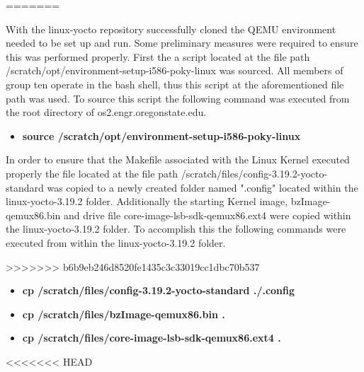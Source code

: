\documentclass[10pt,onecolumn,draftclsnofoot]{IEEEtran} %
\begin{document}
\begin{singlespace}
=======
\hfill\break

  \normalfont \indent With the linux-yocto repository successfully cloned the QEMU environment needed to be set up and run. Some preliminary measures were required to ensure this was performed properly. First the a script located at the file path /scratch/opt/environment-setup-i586-poky-linux was sourced. All members of group ten operate in the bash shell, thus this script at the aforementioned file path was used. To source this script the following command was executed from the root directory of os2.engr.oregonstate.edu.

\hfill\break
  \begin{itemize}
    \item \textbf{source /scratch/opt/environment-setup-i586-poky-linux}
  \end{itemize}
\hfill\break
  \normalfont \indent In order to ensure that the Makefile associated with the Linux Kernel executed properly the file located at the file path /scratch/files/config-3.19.2-yocto-standard was copied to a newly created folder named ".config" located within the linux-yocto-3.19.2 folder. Additionally the starting Kernel image, bzImage-qemux86.bin and drive file core-image-lsb-sdk-qemux86.ext4 were copied within the linux-yocto-3.19.2 folder. To accomplish this the following commands were executed from within the linux-yocto-3.19.2 folder.

\hfill\break
>>>>>>> b6b9eb246d8520fe1435c3c33019cc1dbc70b537
  \begin{itemize}
    \item \textbf{cp /scratch/files/config-3.19.2-yocto-standard ./.config}
    \item \textbf{cp /scratch/files/bzImage-qemux86.bin .}
    \item \textbf{cp /scratch/files/core-image-lsb-sdk-qemux86.ext4 .}
  \end{itemize}
<<<<<<< HEAD
 

\end{singlespace}
\end{document}
